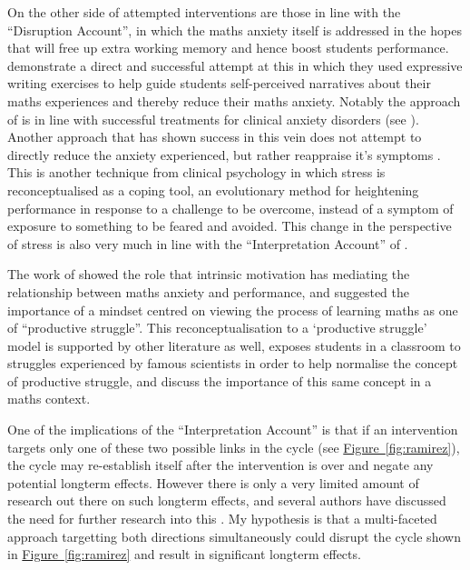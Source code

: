 \documentclass[14pt]{memoir}
\newcommand{\reffig}[1]{\hyperref[fig:#1]{Figure~\ref{fig:#1}}}
\begin{document}
On the other side of attempted interventions are those in line with the ``Disruption Account'', in which the maths anxiety itself is addressed in the hopes that will free up extra working memory and hence boost students performance.   demonstrate a direct and successful attempt at this in which they used expressive writing exercises to help guide students self-perceived narratives about their maths experiences and thereby reduce their maths anxiety. Notably the approach of  is in line with successful treatments for clinical anxiety disorders (see ). Another approach that has shown success in this vein does not attempt to directly reduce the anxiety experienced, but rather reappraise it's symptoms \cite{Jamieson2016}. This is another technique from clinical psychology in which stress is reconceptualised as a coping tool, an evolutionary method for heightening performance in response to a challenge to be overcome, instead of a symptom of exposure to something to be feared and avoided. This change in the perspective of stress is also very much in line with the ``Interpretation Account'' of .

The work of  showed the role that intrinsic motivation has mediating the relationship between maths anxiety and performance, and suggested the importance of a mindset centred on viewing the process of learning maths as one of ``productive struggle''. This reconceptualisation to a `productive struggle' model is supported by other literature as well,  exposes students in a classroom to struggles experienced by famous scientists in order to help normalise the concept of productive struggle, and  discuss the importance of this same concept in a maths context.

One of the implications of the ``Interpretation Account'' is that if an intervention targets only one of these two possible links in the cycle (see \reffig{ramirez}), the cycle may re-establish itself after the intervention is over and negate any potential longterm effects. However there is only a very limited amount of research out there on such longterm effects, and several authors have discussed the need for further research into this \cite{Pellicioni2016,Chang2016}. My hypothesis is that a multi-faceted approach targetting both directions simultaneously could disrupt the cycle shown in \reffig{ramirez} and result in significant longterm effects.
\end{document}
